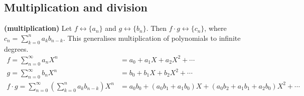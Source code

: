 \documentclass[a4paper, 12pt]{report}
\begin{document}
\subsection{Multiplication and division}
\begin{defn}\label{def:gf-multiplication}
\textbf{(multiplication)} Let $f \longleftrightarrow \{a_n\}$ and $g \longleftrightarrow \{b_n\}$. Then $f \cdot g \longleftrightarrow \{c_n\}$, where $c_n = \sum_{k = 0}^{n} a_k b_{n - k}$. This generalises multiplication of polynomials to infinite degrees.
\begin{align*}
f = \sum_{n = 0}^\infty a_n X^n &= a_0 + a_1 X + a_2 X^2 + \cdots\\
g = \sum_{n = 0}^\infty b_n X^n &= b_0 + b_1 X + b_2 X^2 + \cdots\\
f \cdot g = \sum_{n = 0}^\infty \left(\sum_{k = 0}^n a_k b_{n - k}\right) X^n &= a_0 b_0 + (a_0 b_1 + a_1 b_0) X + (a_0 b_2 + a_1 b_1 + a_2 b_0) X^2 + \cdots\\
\end{align*}
\end{defn}
\end{document}
